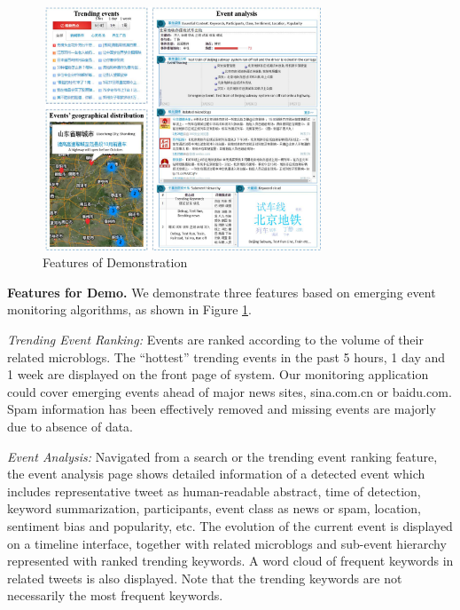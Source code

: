 \makeatletter
\setlength{\@fptop}{0pt}
\makeatother

\begin{figure}[!t]
\centering
\includegraphics[width=3.3in, height=2.85in]{UI}
\caption{Features of Demonstration}
\label{fig:UI}
\vspace{-3ex}
\end{figure}


\noindent\textbf{Features for Demo.}
We demonstrate three features based on emerging event monitoring algorithms, as shown in Figure \ref{fig:UI}.

\emph{Trending Event Ranking:}
Events are ranked according to the volume of their related microblogs.
The ``hottest'' trending events in the past 5 hours, 1 day and 1 week are displayed on the front page of \ring system.
Our monitoring application could cover emerging events ahead of major news sites, \eg sina.com.cn or baidu.com.
Spam information has been effectively removed and missing events are majorly due to absence of data.

\emph{Event Analysis:}
Navigated from a search or the trending event ranking feature, the event analysis page shows detailed information of a detected event which includes representative tweet as human-readable abstract, time of detection, keyword summarization, participants, event class as news or spam, location, sentiment bias and popularity, etc.
The evolution of the current event is displayed on a timeline interface, together with related microblogs and sub-event hierarchy represented with ranked trending keywords.
A word cloud of frequent keywords in related tweets is also displayed.
Note that the trending keywords are not necessarily the most frequent keywords.

